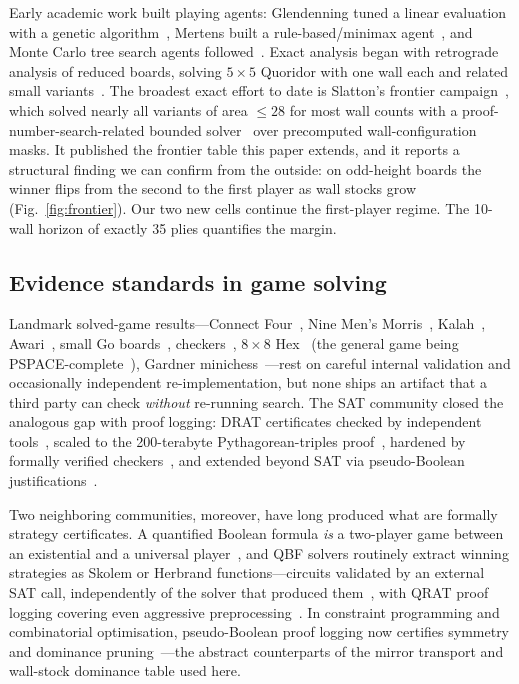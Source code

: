 \documentclass[conference]{IEEEtran}
\begin{document}
Early academic work built playing agents: Glendenning tuned a linear evaluation with a genetic algorithm~\cite{glendenning2002mastering}, Mertens built a rule-based/minimax agent~\cite{mertens2006quoridor}, and Monte Carlo tree search agents followed~\cite{respall2018monte}. Exact analysis began with retrograde analysis of reduced boards, solving $5\times 5$ Quoridor with one wall each and related small variants~\cite{iwanaga2022analysis,iwanaga2023analysis}. The broadest exact effort to date is Slatton's frontier campaign~\cite{slatton2026solving}, which solved nearly all variants of area $\leq 28$ for most wall counts with a proof-number-search-related bounded solver~\cite{allis1994proof} over precomputed wall-configuration masks. It published the frontier table this paper extends, and it reports a structural finding we can confirm from the outside: on odd-height boards the winner flips from the second to the first player as wall stocks grow (Fig.~\ref{fig:frontier}). Our two new cells continue the first-player regime. The 10-wall horizon of exactly 35 plies quantifies the margin.

\subsection{Evidence standards in game solving}

Landmark solved-game results---Connect Four~\cite{allis1988knowledge}, Nine Men's Morris~\cite{gasser1996solving}, Kalah~\cite{irving2000solving}, Awari~\cite{romein2003solving}, small Go boards~\cite{vanderwerf2003solving}, checkers~\cite{schaeffer2007checkers}, $8\times 8$ Hex~\cite{henderson2009solving} (the general game being PSPACE-complete~\cite{even1976combinatorial,reisch1981hex}), Gardner minichess~\cite{mhalla2013gardner}---rest on careful internal validation and occasionally independent re-implementation, but none ships an artifact that a third party can check \emph{without} re-running search. The SAT community closed the analogous gap with proof logging: DRAT certificates checked by independent tools~\cite{wetzler2014drattrim}, scaled to the 200-terabyte Pythagorean-triples proof~\cite{heule2016solving}, hardened by formally verified checkers~\cite{tan2021cakelpr}, and extended beyond SAT via pseudo-Boolean justifications~\cite{elffers2020justifying}.

Two neighboring communities, moreover, have long produced what are formally strategy certificates. A quantified Boolean formula \emph{is} a two-player game between an existential and a universal player~\cite{schaefer1978complexity}, and QBF solvers routinely extract winning strategies as Skolem or Herbrand functions---circuits validated by an external SAT call, independently of the solver that produced them~\cite{balabanov2012unified,niemetz2012resolution}, with QRAT proof logging covering even aggressive preprocessing~\cite{heule2014efficient}. In constraint programming and combinatorial optimisation, pseudo-Boolean proof logging now certifies symmetry and dominance pruning~\cite{bogaerts2023certified}---the abstract counterparts of the mirror transport and wall-stock dominance table used here.
\end{document}
